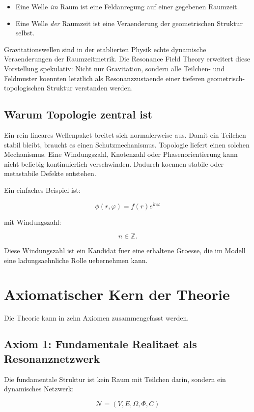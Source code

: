 \documentclass[11pt,a4paper]{article}
\newcommand{\RFT}{Resonance Field Theory}
\newcommand{\ii}{\mathrm{i}}
\begin{document}
\begin{itemize}
  \item Eine Welle \emph{im} Raum ist eine Feldanregung auf einer gegebenen Raumzeit.
  \item Eine Welle \emph{der} Raumzeit ist eine Veraenderung der geometrischen Struktur selbst.
\end{itemize}

Gravitationswellen sind in der etablierten Physik echte dynamische Veraenderungen der Raumzeitmetrik. Die
\RFT{} erweitert diese Vorstellung spekulativ: Nicht nur Gravitation, sondern alle Teilchen- und Feldmuster
koennten letztlich als Resonanzzustaende einer tieferen geometrisch-topologischen Struktur verstanden werden.

\subsection{Warum Topologie zentral ist}

Ein rein lineares Wellenpaket breitet sich normalerweise aus. Damit ein Teilchen stabil bleibt, braucht es
einen Schutzmechanismus. Topologie liefert einen solchen Mechanismus. Eine Windungszahl, Knotenzahl oder
Phasenorientierung kann nicht beliebig kontinuierlich verschwinden. Dadurch koennen stabile oder metastabile
Defekte entstehen.

Ein einfaches Beispiel ist:

\[
\phi(r,\varphi)=f(r)e^{\ii n\varphi}
\]

mit Windungszahl:

\[
n \in \mathbb{Z}.
\]

Diese Windungszahl ist ein Kandidat fuer eine erhaltene Groesse, die im Modell eine ladungsaehnliche Rolle
uebernehmen kann.

\section{Axiomatischer Kern der Theorie}

Die Theorie kann in zehn Axiomen zusammengefasst werden.

\subsection{Axiom 1: Fundamentale Realitaet als Resonanznetzwerk}

Die fundamentale Struktur ist kein Raum mit Teilchen darin, sondern ein dynamisches Netzwerk:

\[
\mathcal{N}=(V,E,\Omega,\Phi,C)
\]
\end{document}

